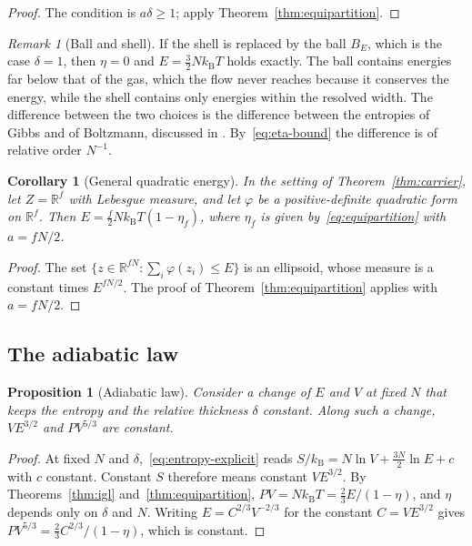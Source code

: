 \documentclass[11pt,a4paper]{article}
\newtheorem{proposition}[theorem]{Proposition}
\newtheorem{corollary}[theorem]{Corollary}
\theoremstyle{definition}
\theoremstyle{remark}
\newtheorem{remark}[theorem]{Remark}
\newcommand{\R}{\mathbb{R}}
\newcommand{\kB}{k_{\mathrm{B}}}
\begin{document}
\begin{proof}
The condition is $a\delta\ge1$; apply Theorem~\ref{thm:equipartition}.
\end{proof}

\begin{remark}[Ball and shell]
\label{rem:ball}
If the shell is replaced by the ball $B_E$, which is the case $\delta=1$, then $\eta=0$ and $E=\tfrac32N\kB T$ holds exactly.
The ball contains energies far below that of the gas, which the flow never reaches because it conserves the energy, while the shell contains only energies within the resolved width.
The difference between the two choices is the difference between the entropies of Gibbs and of Boltzmann, discussed in \citep{gibbs1902,dunkel2014}.
By~\eqref{eq:eta-bound} the difference is of relative order $N^{-1}$.
\end{remark}

\begin{corollary}[General quadratic energy]
\label{cor:quadratic}
In the setting of Theorem~\ref{thm:carrier}, let $Z=\R^{f}$ with Lebesgue measure, and let $\varphi$ be a positive-definite quadratic form on $\R^{f}$.
Then $E=\tfrac f2N\kB T(1-\eta_f)$, where $\eta_f$ is given by~\eqref{eq:equipartition} with $a=fN/2$.
\end{corollary}

\begin{proof}
The set $\{z\in\R^{fN}:\sum_i\varphi(z_i)\le E\}$ is an ellipsoid, whose measure is a constant times $E^{fN/2}$.
The proof of Theorem~\ref{thm:equipartition} applies with $a=fN/2$.
\end{proof}

\subsection{The adiabatic law}

\begin{proposition}[Adiabatic law]
\label{prop:adiabatic}
Consider a change of $E$ and $V$ at fixed $N$ that keeps the entropy and the relative thickness $\delta$ constant.
Along such a change, $VE^{3/2}$ and $PV^{5/3}$ are constant.
\end{proposition}

\begin{proof}
At fixed $N$ and $\delta$,~\eqref{eq:entropy-explicit} reads $S/\kB=N\ln V+\tfrac{3N}{2}\ln E+c$ with $c$ constant.
Constant $S$ therefore means constant $VE^{3/2}$.
By Theorems~\ref{thm:igl} and~\ref{thm:equipartition}, $PV=N\kB T=\tfrac23E/(1-\eta)$, and $\eta$ depends only on $\delta$ and $N$.
Writing $E=C^{2/3}V^{-2/3}$ for the constant $C=VE^{3/2}$ gives $PV^{5/3}=\tfrac23C^{2/3}/(1-\eta)$, which is constant.
\end{proof}
\end{document}
